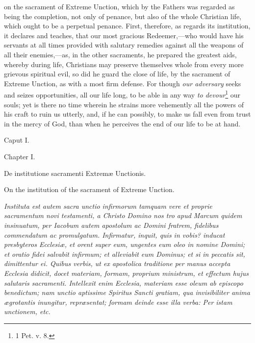 on the sacrament of Extreme Unction, which by the Fathers was regarded as being the completion, not only of penance, but also of the whole Christian life, which ought to be a perpetual penance. First, therefore, as regards its institution, it declares and teaches, that our most gracious Redeemer,—who would have his servants at all times provided with salutary remedies against all the weapons of all their enemies,—as, in the other sacraments, he prepared the greatest aids, whereby during life, Christians may preserve themselves whole from every more grievous spiritual evil, so did he guard the close of life, by the sacrament of Extreme Unction, as with a most firm defense. For though \emph{our adversary} seeks and seizes opportunities, all our life long, to be able in any way \emph{to devour}\footnote{\par   1 Pet. v. 8.} our souls; yet is there no time wherein he strains more vehemently all the powers of his craft to ruin us utterly, and, if he can possibly, to make us fall even from trust in the mercy of God, than when he perceives the end of our life to be at hand.

Caput I.

Chapter I.

De institutione sacramenti Extremæ Unctionis.

On the institution of the sacrament of Extreme Unction.

\emph{Instituta est autem sacra unctio infirmorum tamquam vere et proprie sacramentum novi testamenti, a Christo Domino nos tro apud Marcum quidem insinuatum, per Iacobum autem apostolum ac Domini fratrem, fidelibus commendatum ac promulgatum. Infirmatur, inquit, quis in vobis? inducat presbyteros Ecclesiæ, et orent super eum, ungentes eum oleo in nomine Domini; et oratio fidei salvabit infirmum; et alleviabit eum Dominus; et si in peccatis sit, dimittentur ei. Quibus verbis, ut ex apostolica traditione per manus accepta Ecclesia didicit, docet materiam, formam, proprium ministrum, et effectum hujus salutaris sacramenti. Intellexit enim Ecclesia, materiam esse oleum ab episcopo benedictum; nam unctio aptissime Spiritus Sancti gratiam, qua invisibiliter anima ægrotantis inungitur, repræsentat; formam deinde esse illa verba: Per istam unctionem, etc.}

